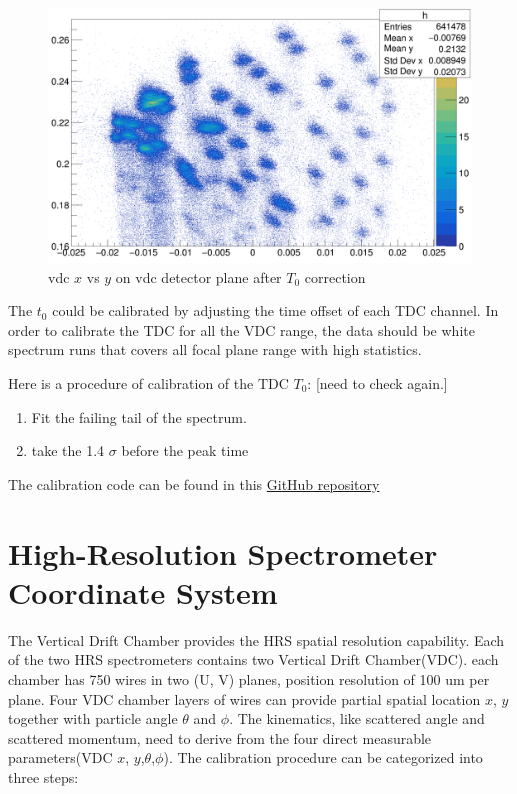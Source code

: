 \begin{figure}
    \centering
    \includegraphics[width=\textwidth]{images/chap3/vdc_t0_after_correction.png}
    \caption{vdc $x$ vs $y$ on vdc detector plane after $T_0$ correction}
    \label{fig:vdc_t0_after_correction}
\end{figure}

The $t_0$ could be calibrated by adjusting the time offset of each TDC channel. In order to calibrate the TDC for all the VDC range, the data should be white spectrum runs that covers all focal plane range with high statistics. 

Here is a procedure of calibration of the TDC $T_0$: [need to check again.]
\begin{enumerate}
    \item Fit the failing tail of the spectrum. 
    \item take the 1.4 $\sigma$ before the peak time
\end{enumerate}

The calibration code can be found in this \hyperlink{https://github.com/Jiansiyu/GeneralScripts/tree/master/VDC_T0_Cali}{GitHub repository}  


\section{High-Resolution Spectrometer Coordinate System}


The Vertical Drift Chamber provides the HRS spatial resolution capability. Each of the two HRS spectrometers contains two Vertical Drift Chamber(VDC). each chamber has 750 wires in two (U, V) planes, position resolution of 100 um per plane. Four VDC chamber layers of wires can provide partial spatial location $x$, $y$ together with particle angle $\theta$ and $\phi$. The kinematics, like scattered angle and scattered momentum, need to derive from the four direct measurable parameters(VDC $x$, $y$,$\theta$,$\phi$). The calibration procedure can be categorized into three steps:

